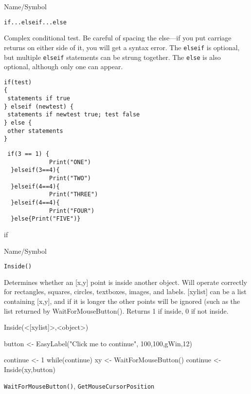 \begin{desc}{Name/Symbol}
\item[Name/Symbol]	\verb+if...elseif...else+            

\item[Description] Complex conditional test.  Be careful of spacing
  the else---if you put carriage returns on either side of it, you
  will get a syntax error. The \verb+elseif+ is optional, but
  multiple \verb+elseif+ statements can be strung together.  The
  \verb+else+ is also optional, although only one can appear.

\item[Usage]
\begin{verbatim}
if(test)
{
 statements if true
} elseif (newtest) {
 statements if newtest true; test false
} else {
 other statements
} 
\end{verbatim}

\item[Example]	
\begin{verbatim}
 if(3 == 1) {
             Print("ONE")
  }elseif(3==4){
             Print("TWO")
  }elseif(4==4){
             Print("THREE")
  }elseif(4==4){
             Print("FOUR")
  }else{Print("FIVE")}
\end{verbatim}
\item[See Also]	
if
\end{desc}
\rl


\begin{desc}{Name/Symbol}
\item[Name/Symbol]	\verb+Inside()+

\item[Description] Determines whether an [x,y] point is inside another
  object.  Will operate correctly for rectangles, squares, circles,
  textboxes, images, and labels. [xylist] can be a list containing
  [x,y], and if it is longer the other points will be ignored (such as
  the list returned by WaitForMouseButton().  Returns 1 if inside, 0
  if not inside.

\item[Usage]	Inside(<[xylist]>,<object>)	

\item[Example]	

      button <- EasyLabel("Click me to continue", 100,100,gWin,12)

      continue <- 1
      while(continue)
      {
         xy <- WaitForMouseButton()
         continue <- Inside(xy,button)
      }
     

\item[See Also]	
\verb+WaitForMouseButton()+, \verb+GetMouseCursorPosition+

\end{desc}
\rl


